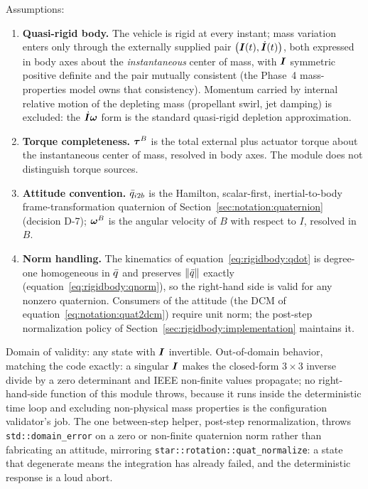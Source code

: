 Assumptions:
\begin{enumerate}
  \item \textbf{Quasi-rigid body.} The vehicle is rigid at every instant;
    mass variation enters only through the externally supplied pair
    $\bigl(\bm{I}(t), \dot{\bm{I}}(t)\bigr)$, both expressed in body axes
    about the \emph{instantaneous} center of mass, with $\bm{I}$ symmetric
    positive definite and the pair mutually consistent (the Phase~4
    mass-properties model owns that consistency). Momentum carried by
    internal relative motion of the depleting mass (propellant swirl, jet
    damping) is excluded: the $\dot{\bm{I}}\bm{\omega}$ form is the
    standard quasi-rigid depletion approximation.
  \item \textbf{Torque completeness.} $\bm{\tau}^{B}$ is the total external
    plus actuator torque about the instantaneous center of mass, resolved in
    body axes. The module does not distinguish torque sources.
  \item \textbf{Attitude convention.} $\bar{q}_{i2b}$ is the Hamilton,
    scalar-first, inertial-to-body frame-transformation quaternion of
    Section~\ref{sec:notation:quaternion} (decision D-7);
    $\bm{\omega}^{B}$ is the angular velocity of $B$ with respect to $I$,
    resolved in $B$.
  \item \textbf{Norm handling.} The kinematics of
    equation~\eqref{eq:rigidbody:qdot} is degree-one homogeneous in
    $\bar{q}$ and preserves $\left\lVert \bar{q} \right\rVert$ exactly
    (equation~\eqref{eq:rigidbody:qnorm}), so the right-hand side is valid
    for any nonzero quaternion. Consumers of the attitude (the DCM of
    equation~\eqref{eq:notation:quat2dcm}) require unit norm; the post-step
    normalization policy of Section~\ref{sec:rigidbody:implementation}
    maintains it.
\end{enumerate}

Domain of validity: any state with $\bm{I}$ invertible. Out-of-domain
behavior, matching the code exactly: a singular $\bm{I}$ makes the
closed-form $3 \times 3$ inverse divide by a zero determinant and IEEE
non-finite values propagate; no right-hand-side function of this module
throws, because it runs inside the deterministic time loop and excluding
non-physical mass properties is the configuration validator's job. The one
between-step helper, post-step renormalization, throws
\texttt{std::domain\_error} on a zero or non-finite quaternion norm rather
than fabricating an attitude, mirroring
\texttt{star::rotation::quat\_normalize}: a state that degenerate means the
integration has already failed, and the deterministic response is a loud
abort.

